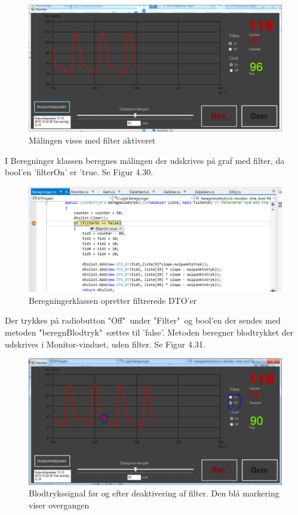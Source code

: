 \begin{figure}[H]
	\centering
	\includegraphics[width=1\textwidth]{Figurer/Test_Deaktiver_1}
	\caption{Målingen vises med filter aktiveret}
\end{figure}

I Beregninger klassen beregnes målingen der udskrives på graf med filter, da bool'en 'filterOn' er 'true. Se Figur 4.30.

\begin{figure}[H]
	\centering
	\includegraphics[width=1\textwidth]{Figurer/Test_Deaktiver_2}
	\caption{Beregningerklassen opretter filtrerede DTO'er}
\end{figure}

Der trykkes på radiobutton "Off"\ under "Filter"\ og bool'en der sendes med metoden "beregnBlodtryk"\ sættes til 'false'. Metoden beregner blodtrykket der udskrives i Monitor-vinduet, uden filter. Se Figur 4.31.

\begin{figure}[H]
	\centering
	\includegraphics[width=1\textwidth]{Figurer/Test_Deaktiver_3}
	\caption{Blodtrykssignal før og efter deaktivering af filter. Den blå markering viser overgangen}
\end{figure}

